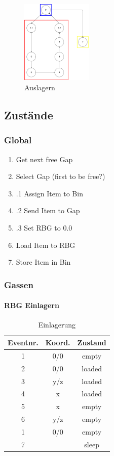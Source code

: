 %
\begin{figure}[H]
  \begin{center}
    \includegraphics[width=0.3\textwidth]{images/auslagern.png}
    \caption{Auslagern}
    \label{fig:out}
  \end{center}
\end{figure}
%

\subsection{Zustände}

\subsubsection{Global}
\begin{enumerate}
  \item Get next free Gap
  \item Select Gap (first to be free?)
  \item .1 Assign Item to Bin
  \item .2 Send Item to Gap
  \item .3 Set RBG to 0.0
  \item Load Item to RBG
  \item Store Item in Bin
\end{enumerate}
%
\subsubsection{Gassen}

\paragraph{RBG Einlagern}

\begin{table}[H]
  \caption{Einlagerung}
  \label{tab:ins}

  \begin{center}
    \begin{tabular}{ccc}

		Eventnr.	& Koord.	& Zustand \\
		\hline
		1 &			0/0 	& empty\\
		2 &			0/0 	& loaded\\
		3 &			y/z 	& loaded\\
		4 	&		x 		& loaded\\
		5 &			x 		& empty\\
		6 &			y/z 	& empty\\
		1	&		0/0		& empty\\
		7 &					& sleep\\
    \end{tabular}
  \end{center}
\end{table}	
